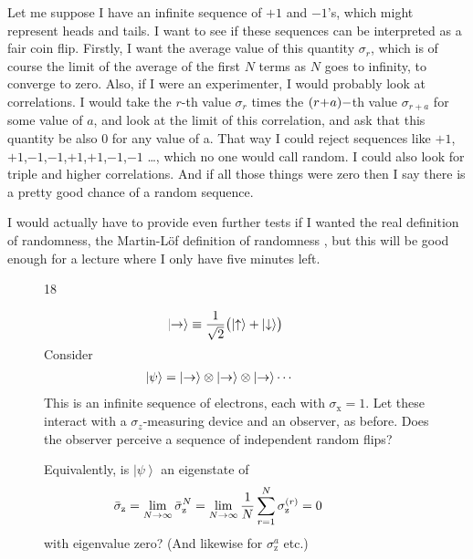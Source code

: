 \documentclass[12pt,nofootinbib]{revtex4}
\newcommand{\ket}[1]{\left|#1\right\rangle}
\newcommand{\x}{\text{x}}
\newcommand{\z}{\text{z}}
\newcommand{\up}{\uparrow}
\newcommand{\dw}{\downarrow}
\begin{document}
Let me suppose I have an infinite sequence of $+1$ and $-1$'s, which might represent heads and tails. I want to see if these sequences can be interpreted as a fair coin flip. Firstly, I want the average value of this quantity $\sigma_r$, which is of course the limit of the average of the first $N$ terms  as $N$ goes to infinity, to converge to zero. Also, if I were an experimenter, I would probably look at correlations. I would take
the $r$-th value $\sigma_r$ times the $(r\hspace{-2pt}+\hspace{-2pt}a)-$th value $\sigma_{r+a}$ for some value of $a$, and look at the limit of this correlation, and ask that this quantity be also 0 for any value of a. That way I could reject sequences like $+1$,$+1$,$-1$,$-1$,$+1$,$+1$,$-1$,$-1$ \ldots, which no one would call random.  I could also look for triple and higher correlations. And if all those things were zero then I say there is a pretty good chance of a random sequence.

I would actually have to provide even further tests if I wanted the real definition of randomness, the Martin-L\"of definition of randomness \cite{martin-lof66ic602}, but this will be good enough for a lecture where I only have five minutes left.

\begin{figure}[htb] 
\begin{mdframed}
  \vspace{5pt}\hfill 18\\[-18pt]
  \begin{raggedright}
  \begin{align}\nonumber
    &\hspace{-20pt}
      \ket{\to }\equiv
      \frac{1}{\sqrt{2}}\bigl(\ket{\up}+\ket{\dw}\bigr)      
      \\[-18pt]\nonumber
  \end{align}
  Consider
  \begin{align}\nonumber
    &\hspace{-20pt}
     \ket{\psi}
      =\ket{\to}\otimes\ket{\to}\otimes\ket{\to}\cdots      
  \end{align}
  This is an infinite sequence of electrons, each with $\sigma_\x=1$. Let these interact with a $\sigma_z$-measuring device and an observer, as before.  Does the observer perceive a sequence of independent random flips?

  Equivalently, is $\ket{\psi}$ an eigenstate of
  \begin{align}\nonumber
    &\hspace{-20pt}
      \bar\sigma_\z =\lim_{N\to\infty}\bar\sigma_\z^N=
      \lim_{N\to\infty}\frac{1}{N}\sum_{r=1}^N\sigma_\z^{(r)}=0
  \end{align}
  with eigenvalue zero?  (And likewise for $\sigma_\z^a$ etc.)
  \end{raggedright}
\vspace{.5\baselineskip}
\end{mdframed}
\end{figure}
\end{document}
